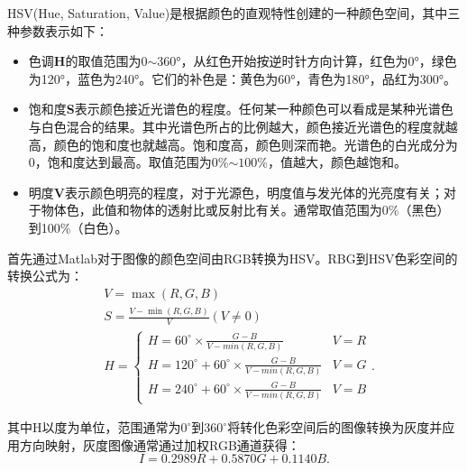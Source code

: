 \documentclass[withoutpreface,bwprint]{cumcmthesis} %
\begin{document}
HSV(Hue, Saturation, Value)是根据颜色的直观特性创建的一种颜色空间，其中三种参数表示如下：
\begin{itemize}
	\item 色调\textbf{H}的取值范围为0$\sim$360°，从红色开始按逆时针方向计算，红色为0°，绿色为120°，蓝色为240°。它们的补色是：黄色为60°，青色为180°，品红为300°。
        \item 饱和度\textbf{S}表示颜色接近光谱色的程度。任何某一种颜色可以看成是某种光谱色与白色混合的结果。其中光谱色所占的比例越大，颜色接近光谱色的程度就越高，颜色的饱和度也就越高。饱和度高，颜色则深而艳。光谱色的白光成分为0，饱和度达到最高。取值范围为0\%$\sim100$\%，值越大，颜色越饱和。
	\item 明度\textbf{V}表示颜色明亮的程度，对于光源色，明度值与发光体的光亮度有关；对于物体色，此值和物体的透射比或反射比有关。通常取值范围为0\%（黑色）到100\%（白色）。
\end{itemize}

首先通过Matlab对于图像的颜色空间由RGB转换为HSV。RBG到HSV色彩空间的转换公式为：
\begin{equation}
	\begin{aligned} 
  &V=\max(R,G,B)\\
  &S=\frac{V-\min(R,G,B)}{V}(V\not=0)\\
  &H=  \begin{cases}
  	H=60^{\circ}\times\frac{G-B}{V-min(R,G,B)}&V=R\\
  	H=120^{\circ}+60^{\circ}\times\frac{G-B}{V-min(R,G,B)}&V=G\\
  	H=240^{\circ}+60^{\circ}\times\frac{G-B}{V-min(R,G,B)}&V=B
  \end{cases} . 
	\end{aligned}   \label{29}
\end{equation}

其中H以度为单位，范围通常为$0^{\circ}$到$360^{\circ}$将转化色彩空间后的图像转换为灰度并应用方向映射，灰度图像通常通过加权RGB通道获得：
\begin{equation}
	I=0.2989R+0.5870G+0.1140B.\label{30}
\end{equation}
\end{document}

